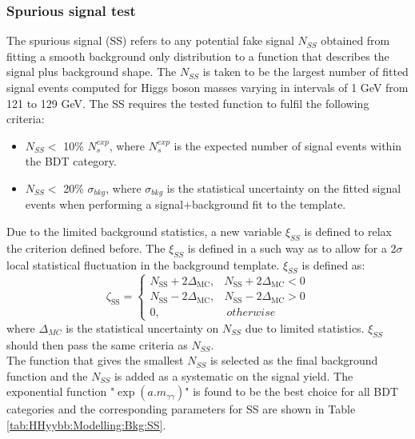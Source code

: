 \subsubsection{Spurious signal test}
\label{HHyybb:Modelling:Bkg:SS}
The spurious signal (SS) refers to any potential fake signal $N_{SS}$ obtained from fitting a smooth background only distribution to a function that describes the signal plus background shape. The $N_{SS}$ is taken to be the largest number of fitted signal events computed for Higgs boson masses varying in intervals of 1 GeV from 121 to 129 GeV. The SS requires the tested function to fulfil the following criteria: 
\begin{itemize}
    \item $N_{SS} < $ 10\% $N_{s}^{exp}$, where $N_{s}^{exp}$ is the expected number of signal events within the BDT category. 
    \item $N_{SS} < $ 20\% $\sigma_{bkg}$, where $\sigma_{bkg}$ is the statistical uncertainty on the fitted signal events when performing a signal+background fit to the template. 
\end{itemize}


Due to the limited background statistics, a new variable $\xi_{SS}$ is defined to relax the criterion defined before. The $\xi_{SS}$ is defined in a such way as to allow for a 2$\sigma$ local statistical fluctuation in the background template. $\xi_{SS}$ is defined as: 
\begin{equation}
    \zeta_{\mathrm{SS}}=\left\{\begin{array}{ll}
N_{\mathrm{SS}}+2 \Delta_{\mathrm{MC}}, & N_{\mathrm{SS}}+2 \Delta_{\mathrm{MC}}<0 \\
N_{\mathrm{SS}}-2 \Delta_{\mathrm{MC}}, & N_{\mathrm{SS}}-2 \Delta_{\mathrm{MC}}>0 \\
0, & \  otherwise 
\end{array}\right.
\end{equation}
where $\Delta_{MC}$ is the statistical uncertainty on $N_{SS}$ due to limited statistics. $\xi_{SS}$ should then pass the same criteria as $N_{SS}$. \\
The function that gives the smallest $N_{SS}$ is selected as the final background function and the $N_{SS}$ is added as a systematic on the signal yield. The exponential function "$\exp(a.m_{\gamma\gamma})$" is found to be the best choice for all BDT categories and the corresponding parameters for SS are shown in Table \ref{tab:HHyybb:Modelling:Bkg:SS}.

